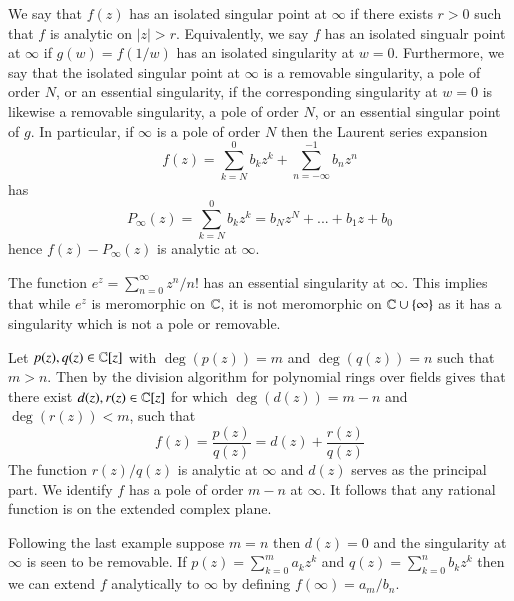 \documentclass[12pt, a4paper, oneside, openright, titlepage]{book}
\begin{document}
\begin{defn}
    We say that $f(z)$ has an isolated singular point at $\infty$ if there exists $r > 0$ such that $f$ is analytic on $|z| > r$. Equivalently, we say $f$ has an isolated singualr point at $\infty$ if $g(w) = f(1/w)$ has an isolated singularity at $w = 0$. Furthermore, we say that the isolated singular point at $\infty$ is a removable singularity, a pole of order $N$, or an essential singularity, if the corresponding singularity at $w=0$ is likewise a removable singularity, a pole of order $N$, or an essential singular point of $g$. In particular, if $\infty$ is a pole of order $N$ then the Laurent series expansion \begin{equation*}
        f(z) = \sum_{k=N}^0b_kz^k + \sum_{n=-\infty}^{-1}b_nz^n
    \end{equation*}
    has  \begin{equation*}
        P_{\infty}(z) = \sum_{k=N}^0b_kz^k = b_Nz^N+...+b_1z+b_0
    \end{equation*}
    hence $f(z) - P_{\infty}(z)$ is analytic at $\infty$.
\end{defn}

\begin{eg}
    The function $e^z = \sum_{n=0}^{\infty}z^n/n!$ has an essential singularity at $\infty$. This implies that while $e^z$ is meromorphic on $\mathbb C$, it is not meromorphic on $\mathbb C\cup \{\infty\}$ as it has a singularity which is not a pole or removable.
\end{eg}

\begin{eg}
    Let $p(z),q(z) \in \mathbb C[z]$ with $\deg(p(z)) = m$ and $\deg(q(z)) = n$ such that $m > n$. Then by the division algorithm for polynomial rings over fields gives that there exist $d(z),r(z) \in \mathbb C[z]$ for which $\deg(d(z)) = m-n$ and $\deg(r(z)) < m$, such that \begin{equation*}
        f(z) = \frac{p(z)}{q(z)} = d(z) + \frac{r(z)}{q(z)}
    \end{equation*}
    The function $r(z)/q(z)$ is analytic at $\infty$ and $d(z)$ serves as the principal part. We identify $f$ has a pole of order $m-n$ at $\infty$. It follows that any rational function is  on the extended complex plane.
\end{eg}

\begin{eg}
    Following the last example suppose $m = n$ then $d(z) = 0$ and the singularity at $\infty$ is seen to be removable. If $p(z) = \sum_{k=0}^ma_kz^k$ and $q(z) = \sum_{k=0}^nb_kz^k$ then we can extend $f$ analytically to $\infty$ by defining $f(\infty) = a_m/b_n$.
\end{eg}
\end{document}
